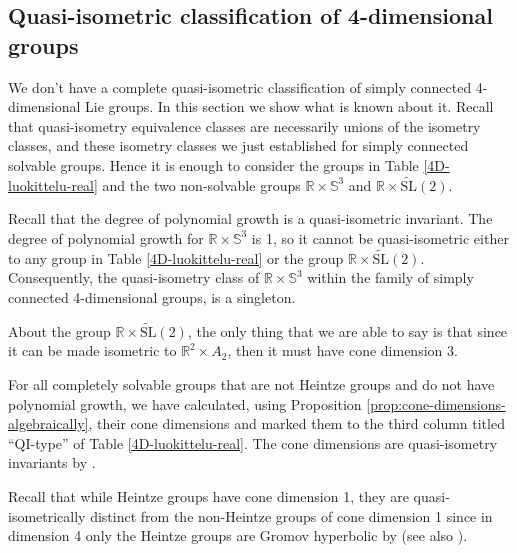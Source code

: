 \documentclass[a4paper,12pt]{amsart}
\newcommand{\pp}{\mathrm}
\theoremstyle{plain}
\theoremstyle{definition}
\theoremstyle{plain}
\theoremstyle{remark}
\newcommand{\laina}[1]{``#1''}
\begin{document}
\subsection{Quasi-isometric classification of 4-dimensional groups}

\label{sec:QI-classification-dim-4}

We don't have a complete quasi-isometric classification of simply connected 4-dimensional Lie groups. In this section we show what is known about it. Recall that quasi-isometry equivalence classes are necessarily unions of the isometry classes, and these isometry classes we just established for simply connected solvable groups. Hence it is enough to consider the groups in Table \ref{4D-luokittelu-real} and the two non-solvable groups \( \mathbb{R} \times  \mathbb{S}^3 \) and \( \mathbb{R} \times \widetilde{\pp{SL}}(2) \).

Recall that the degree of polynomial growth is a quasi-isometric invariant. 
The degree of polynomial growth for \( \mathbb{R} \times  \mathbb{S}^3 \) is 1, so it cannot be quasi-isometric either to any group in Table \ref{4D-luokittelu-real} or the group \( \mathbb{R} \times \widetilde{\pp{SL}}(2) \).
Consequently, the quasi-isometry class of \( \mathbb{R} \times  \mathbb{S}^3 \) within the family of simply connected 4-dimensional groups, is a singleton.

About the group \( \mathbb{R} \times \widetilde{\pp{SL}}(2) \), the only thing that we are able to say is that since it can be made isometric to \( \mathbb{R}^2 \times A_2 \), then it must have cone dimension 3. 

For all completely solvable groups that are not Heintze groups and do not have polynomial growth, we have calculated, using Proposition \ref{prop:cone-dimensions-algebraically}, their cone dimensions and marked them to
the third column titled \laina{QI-type} of Table \ref{4D-luokittelu-real}. The cone dimensions are quasi-isometry invariants by \cite{MR3006687}. 

Recall that while Heintze groups have cone dimension 1, they are quasi-isometrically distinct from the non-Heintze groups of cone dimension 1 since in dimension 4 only the Heintze groups are Gromov hyperbolic  by \cite{MR2826945} (see also \cite[p.\ 277]{Cornulier:qihlc}). 
\end{document}
